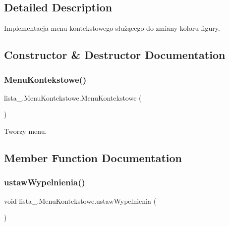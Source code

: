 \subsection{Detailed Description}
Implementacja menu kontekstowego służącego do zmiany koloru figury. 

\subsection{Constructor \& Destructor Documentation}
\mbox{\label{classlista__5_1_1_menu_kontekstowe_a1ea2acb59485840515086be771eb0d5f}} 
\subsubsection{\texorpdfstring{Menu\+Kontekstowe()}{MenuKontekstowe()}}
{\footnotesize\ttfamily lista\+\_.\+Menu\+Kontekstowe.\+Menu\+Kontekstowe (\begin{DoxyParamCaption}{ }\end{DoxyParamCaption})}

Tworzy menu. 

\subsection{Member Function Documentation}
\mbox{\label{classlista__5_1_1_menu_kontekstowe_a374ed94eba427019665e64c496c6bc9b}} 
\subsubsection{\texorpdfstring{ustaw\+Wypelnienia()}{ustawWypelnienia()}}
{\footnotesize\ttfamily void lista\+\_.\+Menu\+Kontekstowe.\+ustaw\+Wypelnienia (\begin{DoxyParamCaption}{ }\end{DoxyParamCaption})\hspace{0.3cm}{\ttfamily [private]}}

